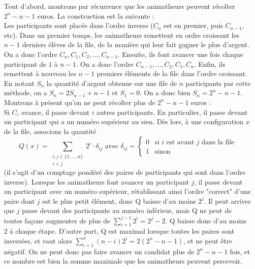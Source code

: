 \begin{sol}
Tout d'abord, montrons par récurrence que les animatheurs peuvent récolter $2^n-n-1$ euros. La construction est la suivante :\\
Les participants sont placés dans l'ordre inverse ($C_n$ est en premier, puis $C_{n-1}$, etc). Dans un premier temps, les animatheurs remettent en ordre croissant les $n-1$ derniers élèves de la file, de la manière qui leur fait gagner le plus d'argent. On a donc l'ordre $C_n, C_1, C_2,\ldots, C_{n-1}$. Ensuite, ils font avancer une fois chaque participant de $1$ à $n-1$. On a donc l'ordre $C_{n-1},\ldots, C_2, C_1, C_n$. Enfin, ils remettent à nouveau les $n-1$ premiers éléments de la file dans l'ordre croissant. En notant $S_n$ la quantité d'argent obtenue sur une file de $n$ participants par cette méthode, on a $S_n=2S_{n-1}+n-1$ et $S_1=0$. On a donc bien $S_n=2^n-n-1$.\\
Montrons à présent qu'on ne peut récolter plus de $2^n-n-1$ euros :\\
Si $C_i$ avance, il passe devant $i$ autres participants. En particulier, il passe devant un participant qui a un numéro supérieur au sien. Dès lors, à une configuration $x$ de la file, associons la quantité
\begin{equation*}
Q(x)=\sum_{\substack{i,j\in\{1,\ldots, n\}\\ i<j}}2^i\cdot\delta_{ij} \textrm{ avec } \delta_{ij}=
\begin{cases}
0 & \textrm{si $i$ est avant $j$ dans la file}\\
1 & \textrm{sinon}
\end{cases}
\end{equation*}
(il s'agit d'un comptage pondéré des paires de participants qui sont dans l'ordre inverse). Lorsque les animatheurs font avancer un participant $j$, il passe devant un participant avec un numéro supérieur, rétablissant ainsi l'ordre "correct" d'une paire dont $j$ est le plus petit élément, donc Q baisse d'au moins $2^j$. Il peut arriver que $j$ passe devant des participants au numéro inférieur, mais Q ne peut de toutes façons augmenter de plus de $\sum_{i=1}^{j-1} 2^i=2^j-2$. Q baisse donc d'au moins $2$ à chaque étape. D'autre part, Q est maximal lorsque toutes les paires sont inversées, et vaut alors $\sum_{i=1}^n (n-i)2^i=2(2^n-n-1)$, et ne peut être négatif. On ne peut donc pas faire avancer un candidat plus de $2^n-n-1$ fois, et ce nombre est bien la somme maximale que les animatheurs peuvent percevoir.
\end{sol}

